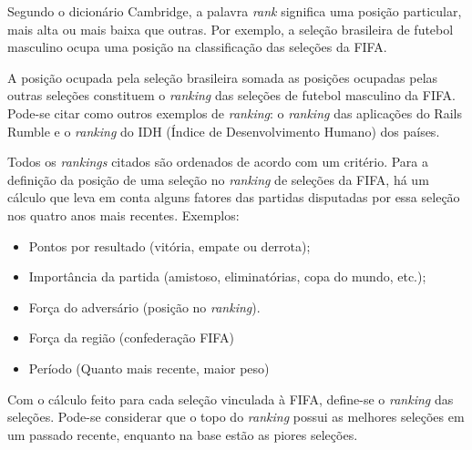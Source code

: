 Segundo o dicionário Cambridge, a palavra \emph{rank} significa uma posição
particular, mais alta ou mais baixa que outras. Por exemplo, a seleção
brasileira de futebol masculino ocupa uma posição na classificação das
seleções da FIFA.

A posição ocupada pela seleção brasileira somada as posições ocupadas pelas
outras seleções constituem o \emph{ranking} das seleções de futebol
masculino da FIFA. Pode-se citar como outros exemplos de \emph{ranking}: o
\emph{ranking} das aplicações do Rails Rumble e o \emph{ranking} do IDH
(Índice de Desenvolvimento Humano) dos países.

Todos os \emph{rankings} citados são ordenados de acordo com um critério.
Para a definição da posição de uma seleção no \emph{ranking} de seleções
da FIFA, há um cálculo que leva em conta alguns fatores das partidas
disputadas por essa seleção nos quatro anos mais recentes. Exemplos:

\begin{itemize}
    \item Pontos por resultado (vitória, empate ou derrota);
    \item Importância da partida (amistoso, eliminatórias, copa do mundo, etc.);
    \item Força do adversário (posição no \emph{ranking}).
    \item Força da região (confederação FIFA)
    \item Período (Quanto mais recente, maior peso)
\end{itemize}

Com o cálculo feito para cada seleção vinculada à FIFA, define-se o
\emph{ranking} das seleções. Pode-se considerar que o topo do \emph{ranking}
possui as melhores seleções em um passado recente, enquanto na base estão
as piores seleções.